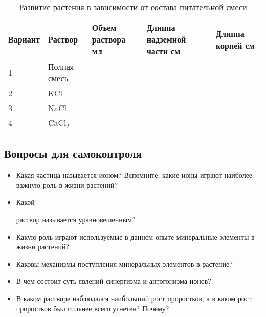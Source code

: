 \begin{table}
\label{evolution_dependance}
\caption{Развитие растения в зависимости от состава питательной смеси}
\begin{tabularx}{\linewidth}{|X|X|X|X|X|}
\hline	Вариант	&	Раствор	&	Объем раствора мл	&	Длинна надземной части см	&	Длинна корней см	\\
\hline	1	&	Полная смесь	&	 	&	 	&	 	\\
\hline	2	&	KCl	&	 	&	 	&	 	\\
\hline	3	&	NaCl	&	 	&	 	&	 	\\
\hline	4	&	CaCl$_{2}$	&	 	&	 	&	 	\\
\hline															
\end{tabularx}
\end{table}
	
	\subsection*{Вопросы для самоконтроля}

	\begin{itemize}
		\item Какая частица называется \hypertarget{ion}{ионом}? Вспомните, какие ионы играют наиболее важную роль в жизни растений?
		\item \hypertarget{mixture}{Какой} раствор называется уравновешенным?
		\item Какую роль играют используемые в данном опыте минеральные элементы в жизни растений?
		\item Каковы механизмы поступления минеральных элементов в растение?
		\item В чем состоит суть явлений \hypertarget{sinergism}{синергизма и антогонизма} ионов?
		\item В каком растворе наблюдался наибольший рост \hypertarget{growth_question}{проростков}, а в каком рост проростков был сильнее всего угнетен? Почему? 
	\end{itemize}
	